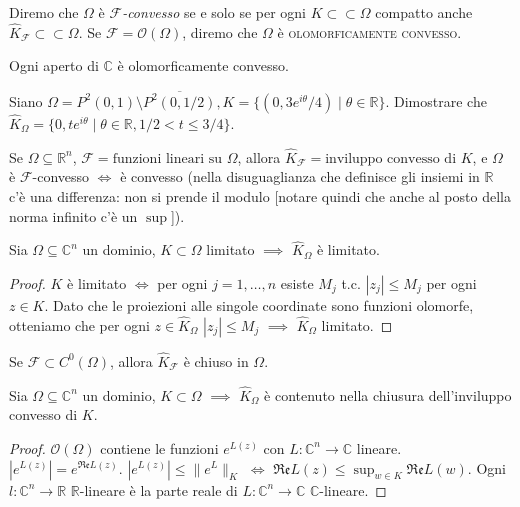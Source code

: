 Diremo che $\Omega$ è \textit{$\mathcal{F}$-convesso} se e solo se per ogni $K \subset \subset \Omega$ compatto anche $\hat{K}_{\mathcal{F}} \subset \subset \Omega$. Se $\mathcal{F}=\mathcal{O}(\Omega)$, diremo che $\Omega$ è \textsc{olomorficamente convesso}.

\begin{oss}
  Ogni aperto di $\mathbb{C}$ è olomorficamente convesso.
\end{oss}

\begin{exc}
  Siano $\Omega=P^2(0,1)\setminus\overline{P^2(0,1/2)}, K=\{(0,3e^{i\theta}/4) \mid \theta \in \mathbb{R}\}$. Dimostrare che $\hat{K}_\Omega=\{0, te^{i\theta} \mid \theta \in \mathbb{R}, 1/2 < t \le 3/4\}$.
\end{exc}

\begin{exc}
  Se $\Omega \subseteq \mathbb{R}^n$, $\mathcal{F}=\text{funzioni lineari su }\Omega$, allora $\hat{K}_{\mathcal{F}}=\text{inviluppo convesso di }K$, e $\Omega$ è $\mathcal{F}$-convesso $\iff$ è convesso (nella disuguaglianza che definisce gli insiemi in $\mathbb{R}$ c'è una differenza: non si prende il modulo [notare quindi che anche al posto della norma infinito c'è un $\sup$]).
\end{exc}

\begin{lm}
  Sia $\Omega \subseteq \mathbb{C}^n$ un dominio, $K \subset \Omega$ limitato $\implies$ $\hat{K}_{\Omega}$ è limitato.
\end{lm}

\begin{proof}
  $K$ è limitato $\iff$ per ogni $j=1,\dots,n$ esiste $M_j$ t.c. $|z_j| \le M_j$ per ogni $z \in K$. Dato che le proiezioni alle singole coordinate sono funzioni olomorfe, otteniamo che per ogni $z \in \hat{K}_\Omega$ $|z_j| \le M_j$ $\implies$ $\hat{K}_\Omega$ limitato.
\end{proof}

\begin{oss}
  Se $\mathcal{F} \subset C^0(\Omega)$, allora $\hat{K}_{\mathcal{F}}$ è chiuso in $\Omega$.
\end{oss}

\begin{lm}
  Sia $\Omega \subseteq \mathbb{C}^n$ un dominio, $K \subset \Omega$ $\implies$ $\hat{K}_\Omega$ è contenuto nella chiusura dell'inviluppo convesso di $K$.
\end{lm}

\begin{proof}
  $\mathcal{O}(\Omega)$ contiene le funzioni $e^{L(z)}$ con $L: \mathbb{C}^n \longrightarrow \mathbb{C}$ lineare. $|e^{L(z)}|=e^{\mathfrak{Re}L(z)}$. $|e^{L(z)}| \le \|e^L\|_K$ $\iff$ $\displaystyle \mathfrak{Re}L(z) \le \sup_{w \in K} \mathfrak{Re}L(w)$.
  Ogni $l: \mathbb{C}^n \longrightarrow \mathbb{R}$ $\mathbb{R}$-lineare è la parte reale di $L:\mathbb{C}^n \longrightarrow \mathbb{C}$ $\mathbb{C}$-lineare.
\end{proof}

